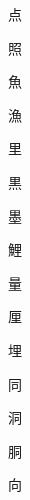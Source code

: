 \begin{spacing}{2.5}
{\Huge \begin{CJK}{UTF8}{min} 点\end{CJK}}\hspace{0.1cm}
{\Huge \begin{CJK}{UTF8}{min} 照\end{CJK}}\hspace{0.1cm}
{\Huge \begin{CJK}{UTF8}{min} 魚\end{CJK}}\hspace{0.1cm}
{\Huge \begin{CJK}{UTF8}{min} 漁\end{CJK}}\hspace{0.1cm}
{\Huge \begin{CJK}{UTF8}{min} 里\end{CJK}}\hspace{0.1cm}
{\Huge \begin{CJK}{UTF8}{min} 黒\end{CJK}}\hspace{0.1cm}
{\Huge \begin{CJK}{UTF8}{min} 墨\end{CJK}}\hspace{0.1cm}
{\Huge \begin{CJK}{UTF8}{min} 鯉\end{CJK}}\hspace{0.1cm}
{\Huge \begin{CJK}{UTF8}{min} 量\end{CJK}}\hspace{0.1cm}
{\Huge \begin{CJK}{UTF8}{min} 厘\end{CJK}}\hspace{0.1cm}
{\Huge \begin{CJK}{UTF8}{min} 埋\end{CJK}}\hspace{0.1cm}
{\Huge \begin{CJK}{UTF8}{min} 同\end{CJK}}\hspace{0.1cm}
{\Huge \begin{CJK}{UTF8}{min} 洞\end{CJK}}\hspace{0.1cm}
{\Huge \begin{CJK}{UTF8}{min} 胴\end{CJK}}\hspace{0.1cm}
{\Huge \begin{CJK}{UTF8}{min} 向\end{CJK}}\hspace{0.1cm}

\end{spacing}
